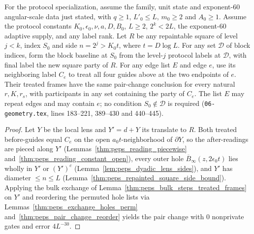 \begin{lemma}
    For the protocol specialization, assume the family, unit state and
    exponent-$60$ angular-scale data just stated, with
    $q\ge1$, $L'_0\le L$, $m_0\ge2$ and $A_0\ge1$. Assume the protocol
    constants $K_0,\epsilon_0,\nu,a,D,B_0$, $L\ge2$, $2^k<2L$, the
    exponent-$60$ adaptive supply, and any label rank. Let $R$ be any
    repaintable square of level $j<k$, index $S_0$ and side
    $n=2^j>K_0t$, where $t=D\log L$. For any set $\mathcal D$ of block
    indices, form the block baseline at $S_0$ from the level-$j$ protocol
    labels at $\mathcal D$, with final label the new square party of $R$.
    For any edge list $E$ and edge $e$, use its neighboring label $C_e$
    to treat all four guides above at the two endpoints of $e$. Their
    treated frames have the same pair-change conclusion for every natural
    $r,K,r_s$, with participants in any set containing the party of $C_e$. The list
    $E$ may repeat edges and may contain $e$; no condition
    $S_0\notin\mathcal D$ is required
    (\texttt{06-geometry.tex}, lines 183--221, 389--430 and 440--445).

\end{lemma}

\begin{proof}\leanok
    Let $Y$ be the local lens and $Y'=d+Y$ its translate to $R$. Both treated before-guides equal $C_e$ on the open $a_0t$-neighborhood of $\partial Y$, so the after-readings are pieced along $Y'$ (Lemmas~\ref{thm:peps_reading_piecewise} and~\ref{thm:peps_reading_constant_open}), every outer hole $\overline B_\infty(z,2\epsilon_0t)$ lies wholly in $Y'$ or $(Y')^c$ (Lemma~\ref{lem:peps_dyadic_lens_sides}), and $Y'$ has diameter $\le n\le L$ (Lemma~\ref{thm:peps_repainted_square_side_bound}). Applying the bulk exchange of Lemma~\ref{thm:peps_bulk_steps_treated_frames} on $Y'$ and reordering the permuted hole lists via Lemmas~\ref{thm:peps_exchange_holes_perm} and~\ref{thm:peps_pair_change_reorder} yields the pair change with $0$ nonprivate gates and error $4L^{-30}$.
\end{proof}

